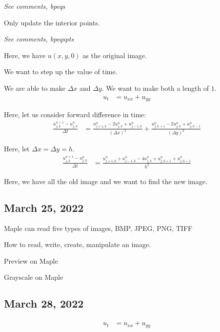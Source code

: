
\emph{See comments, bpeqs}

Only update the interior points.


\emph{See comments, bpeqspts}

Here, we have $u(x, y, 0)$ as the original image.

We want to step up the value of time.



We are able to make $\Delta x$ and $\Delta y$. We want to make both a length of $1$.
%
\begin{align}
  u_t & = u_{xx} + u_{yy}
\end{align}

Here, let us consider forward difference in time:
%
\begin{align}
  \frac
  {u^{n + 1}_{j, k} - u^n_{j, k}}
  {\Delta t}
  & =
  \frac
  {
  u^n_{j+1, k} - 2u^n_{j, k} + u^n_{j - 1, k}
  }
  {
  (\Delta x)^2
  }
  +
  \frac
  {
  u^n_{j, k+1} - 2u^n_{j, k} + u^n_{j, k - 1}
  }
  {
  (\Delta y)^2
  }
\end{align}

Here, let $\Delta x = \Delta y = h$.
%
\begin{align}
  \frac
  {u^{n + 1}_{j, k} - u^n_{j, k}}
  {\Delta t}
  & = \frac
  {
  u^n_{j+1, k} + u^n_{j-1, k} - 4u^n_{j, k} + u^n_{j, k+1} + u^n_{j, k-1}
  }
  {h^2}
\end{align}

Here, we have all the old image and we want to find the new image.

\subsection*{March 25, 2022}


Maple can read five types of images, BMP, JPEG, PNG, TIFF

How to read, write, create, manipulate an image.

Preview on Maple

Grayscale on Maple

\subsection*{March 28, 2022}
%
\begin{align}
  u_t & = u_{xx} + u_{yy}
\end{align}

